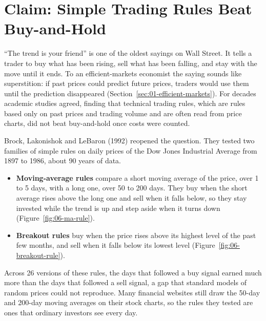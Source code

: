 \makeatletter
\makeatother

\chapter{Claim: Simple Trading Rules Beat Buy-and-Hold}
\label{ch:05}

``The trend is your friend'' is one of the oldest sayings on Wall Street. It tells a trader to buy what has been rising, sell what has been falling, and stay with the move until it ends. To an efficient-markets economist the saying sounds like superstition: if past prices could predict future prices, traders would use them until the prediction disappeared (Section~\ref{sec:01-efficient-markets}). For decades academic studies agreed, finding that technical trading rules, which are rules based only on past prices and trading volume and are often read from price charts, did not beat buy-and-hold once costs were counted. 

Brock, Lakonishok and LeBaron (1992) reopened the question. They tested two families of simple rules on daily prices of the Dow Jones Industrial Average from 1897 to 1986, about 90 years of data. 
\begin{itemize}
\item \textbf{Moving-average rules} compare a short moving average of the price, over 1 to 5 days, with a long one, over 50 to 200 days. They buy when the short average rises above the long one and sell when it falls below, so they stay invested while the trend is up and step aside when it turns down (Figure~\ref{fig:06-ma-rule}). 
\item \textbf{Breakout rules} buy when the price rises above its highest level of the past few months, and sell when it falls below its lowest level (Figure~\ref{fig:06-breakout-rule}).
\end{itemize}
Across 26 versions of these rules, the days that followed a buy signal earned much more than the days that followed a sell signal, a gap that standard models of random prices could not reproduce. Many financial websites still draw the 50-day and 200-day moving averages on their stock charts, so the rules they tested are ones that ordinary investors see every day.

